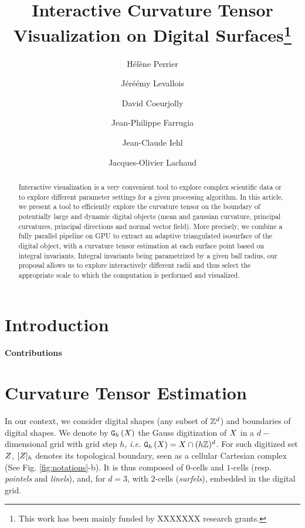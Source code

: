 \documentclass{llncs}
\title{Interactive Curvature Tensor Visualization on Digital
Surfaces\thanks{This work has been mainly funded by XXXXXXX research grants.}}
\author{H\'el\`ene Perrier\inst{1}\and J\'eré\'emy Levallois\inst{1,2}\and David
Coeurjolly\inst{1}\and Jean-Philippe Farrugia\inst{1}\and Jean-Claude
Iehl\inst{1}\and Jacques-Olivier Lachaud\inst{2} }
\institute{ Universit\'e de Lyon, CNRS\\
   LIRIS, UMR5205, F-69621, France
   \and
Universit\'e de Savoie, CNRS\\
LAMA, UMR5127, F-73776, France\\
}
\begin{document}
\maketitle


\begin{abstract}\sloppy
  Interactive visualization is a very convenient tool to explore
  complex scientific data or to explore different parameter settings
  for a given processing algorithm. In this article, we present a tool
  to efficiently explore the curvature tensor on the boundary of
  potentially large and dynamic digital objects (mean and gaussian curvature,
  principal curvatures, principal directions and normal vector
  field). More precisely, we combine a fully parallel pipeline on GPU
  to extract an adaptive triangulated isosurface of the digital
  object, with a curvature tensor estimation at each surface point
  based on integral invariants. Integral invariants being parametrized
  by a given ball radius, our proposal allows us to explore
  interactively different radii and thus select the appropriate scale
  to which the computation is performed and visualized.


\end{abstract}

\section{Introduction}
\label{sec:introduction}



\textbf{Contributions}




\section{Curvature Tensor Estimation}
\label{sec:curv-tens-estim}

In our context, we consider digital shapes (any subset of ${\mathbb{Z}}^d$) and boundaries
of digital shapes. We denote by $\mathtt{G}_{h}\left(X\right)$ the Gauss digitization of
$X$ in a $d-$dimensional grid with grid step $h$, \emph{i.e.}
$\mathtt{G}_{h}\left(X\right) = X \cap (h{\mathbb{Z}})^d$. For such digitized set $Z$,
$\lbrack Z \rbrack_{h}$ denotes its topological boundary, seen as a cellular Cartesian
complex (See Fig. \ref{fig:notations}-b). It is thus composed of $0$-cells and
$1$-cells (resp. \emph{pointels} and \emph{linels}), and, for $d=3$, with
$2$-cells ({\em surfels}), embedded in the digital grid.
\end{document}
